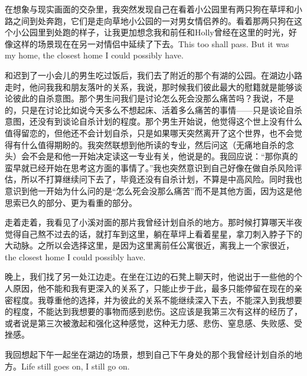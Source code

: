 在想象与现实画面的交杂里，我突然发现自己在看着小公园里有两只狗在草坪和小路之间到处奔跑，它们是走向草地小公园的一对男女情侣养的。看着那两只狗在这个小公园里到处跑的样子，让我更加想念我和前任和Holly曾经在这里的时光，好像这样的场景现在在另一对情侣中延续了下去。This too shall pass. But it was my home, the closest home I could possibly have.

和迟到了一小会儿的男生吃过饭后，我们去了附近的那个有湖的公园。在湖边小路走时，他问我我和朋友落叶的关系，我说，那时候我们彼此最大的慰籍就是能够谈论彼此的自杀意图。那个男生问我们是讨论怎么死会没那么痛苦吗？我说，不是的，只是在讨论比如说今天多么不想起床、活着多么痛苦的事情——只是谈论自杀意图，还没有到谈论自杀计划的程度。那个男生开始说，他觉得这个世上没有什么值得留恋的，但他还不会计划自杀，只是如果哪天突然离开了这个世界，也不会觉得有什么值得期盼的。我突然联想到他所读的专业，然后问这（无痛地自杀的念头）会不会是和他一开始决定读这一专业有关，他说是的。我回应说：“那你真的蛮早就已经开始在思考这方面的事情了。”我也突然意识到自己好像在做自杀风险评估，所以不打算继续问下去了，毕竟还没有自杀计划，不算是中高风险。同时我也意识到他一开始为什么问的是“怎么死会没那么痛苦”而不是其他方面，因为这是他思索已久的部分、更为看重的部分。

走着走着，我看见了小溪对面的那片我曾经计划自杀的地方。那时候打算哪天半夜觉得自己熬不过去的话，就打车到这里，躺在草坪上看着星星，拿刀刺入脖子下的大动脉。之所以会选择这里，是因为这里离前任公寓很近，离我上一个家很近，the closest home I could possibly have.


晚上，我们找了另一处江边走。在坐在江边的石凳上聊天时，他说出于一些他的个人原因，他不能和我有更深入的关系了，只能止步于此，最多只能停留在现在的亲密程度。我尊重他的选择，并为彼此的关系不能继续深入下去，不能深入到我想要的程度，不能达到我想要的事物而感到悲伤。这应该是我第三次有这样的经历了，或者说是第三次被激起和强化这种感觉，这种无力感、悲伤、窒息感、失败感、受挫感。

我回想起下午一起坐在湖边的场景，想到自己下午身处的那个我曾经计划自杀的地方。Life still goes on, I still go on.

